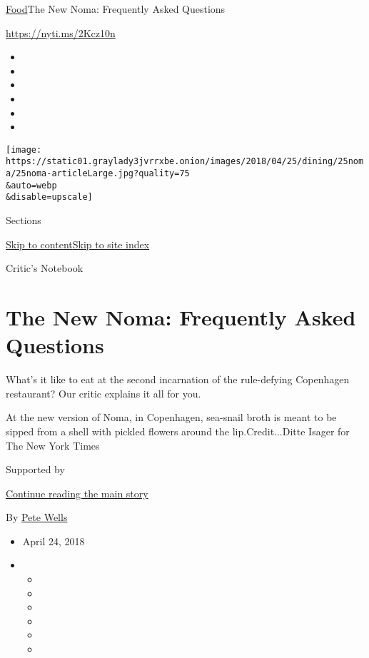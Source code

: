 \href{/section/food}{Food}\textbar{}The New Noma: Frequently Asked
Questions

\url{https://nyti.ms/2Kcz10n}

\begin{itemize}
\item
\item
\item
\item
\item
\item
\end{itemize}

\texttt{[image: https://static01.graylady3jvrrxbe.onion/images/2018/04/25/dining/25noma/25noma-articleLarge.jpg?quality=75\\\&auto=webp\\\&disable=upscale]}

Sections

\protect\hyperlink{site-content}{Skip to
content}\protect\hyperlink{site-index}{Skip to site index}

Critic's Notebook

\hypertarget{the-new-noma-frequently-asked-questions}{%
\section{The New Noma: Frequently Asked
Questions}\label{the-new-noma-frequently-asked-questions}}

What's it like to eat at the second incarnation of the rule-defying
Copenhagen restaurant? Our critic explains it all for you.

At the new version of Noma, in Copenhagen, sea-snail broth is meant to
be sipped from a shell with pickled flowers around the
lip.Credit...Ditte Isager for The New York Times

Supported by

\protect\hyperlink{after-sponsor}{Continue reading the main story}

By \href{http://www.nytimes3xbfgragh.onion/by/pete-wells}{Pete Wells}

\begin{itemize}
\item
  April 24, 2018
\item
  \begin{itemize}
  \item
  \item
  \item
  \item
  \item
  \item
  \end{itemize}
\end{itemize}

